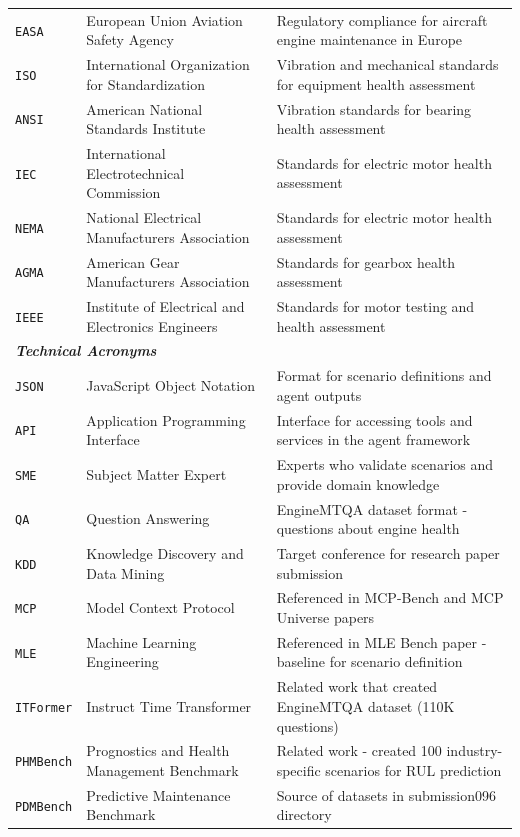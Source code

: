 \begin{table}[ht]
\begin{tabular}{@{}lll@{}}
\texttt{EASA} & European Union Aviation Safety Agency & Regulatory compliance for aircraft engine maintenance in Europe \\
\texttt{ISO} & International Organization for Standardization & Vibration and mechanical standards for equipment health assessment \\
\texttt{ANSI} & American National Standards Institute & Vibration standards for bearing health assessment \\
\texttt{IEC} & International Electrotechnical Commission & Standards for electric motor health assessment \\
\texttt{NEMA} & National Electrical Manufacturers Association & Standards for electric motor health assessment \\
\texttt{AGMA} & American Gear Manufacturers Association & Standards for gearbox health assessment \\
\texttt{IEEE} & Institute of Electrical and Electronics Engineers & Standards for motor testing and health assessment \\
\midrule
\multicolumn{3}{l}{\textbf{\textit{Technical Acronyms}}} \\
\texttt{JSON} & JavaScript Object Notation & Format for scenario definitions and agent outputs \\
\texttt{API} & Application Programming Interface & Interface for accessing tools and services in the agent framework \\
\texttt{SME} & Subject Matter Expert & Experts who validate scenarios and provide domain knowledge \\
\texttt{QA} & Question Answering & EngineMTQA dataset format - questions about engine health \\
\texttt{KDD} & Knowledge Discovery and Data Mining & Target conference for research paper submission \\
\texttt{MCP} & Model Context Protocol & Referenced in MCP-Bench and MCP Universe papers \\
\texttt{MLE} & Machine Learning Engineering & Referenced in MLE Bench paper - baseline for scenario definition \\
\texttt{ITFormer} & Instruct Time Transformer & Related work that created EngineMTQA dataset (110K questions) \\
\texttt{PHMBench} & Prognostics and Health Management Benchmark & Related work - created 100 industry-specific scenarios for RUL prediction \\
\texttt{PDMBench} & Predictive Maintenance Benchmark & Source of datasets in submission096 directory \\

\end{tabular}
\end{table}
